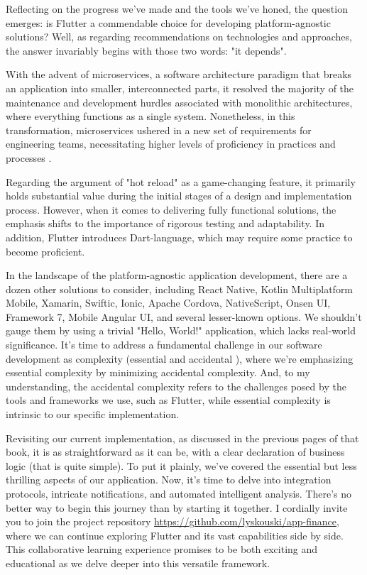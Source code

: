 
Reflecting on the progress we've made and the tools we've honed, the question emerges: is Flutter a commendable 
choice for developing platform-agnostic solutions? Well, as regarding recommendations on technologies and approaches, 
the answer invariably begins with those two words: "it depends".

With the advent of microservices, a software architecture paradigm that breaks an application into smaller, 
interconnected parts, it resolved the majority of the maintenance and development hurdles associated with monolithic 
architectures, where everything functions as a single system. Nonetheless, in this transformation, microservices 
ushered in a new set of requirements for engineering teams, necessitating higher levels of proficiency in practices 
and processes \cite{Mugr23}.

Regarding the argument of "hot reload" as a game-changing feature, it primarily holds substantial value during the 
initial stages of a design and implementation process. However, when it comes to delivering fully functional solutions, 
the emphasis shifts to the importance of rigorous testing and adaptability. In addition, Flutter introduces 
Dart-language, which may require some practice to become proficient.

In the landscape of the platform-agnostic application development, there are a dozen other solutions to consider, 
including React Native, Kotlin Multiplatform Mobile, Xamarin, Swiftic, Ionic, Apache Cordova, NativeScript, Onsen UI, 
Framework 7, Mobile Angular UI, and several lesser-known options. We shouldn't gauge them by using a trivial "Hello, 
World!" application, which lacks real-world significance. It's time to address a fundamental challenge in our software
development as complexity (essential and accidental \cite{Broo87}), where we're emphasizing essential complexity by 
minimizing accidental complexity. And, to my understanding, the accidental complexity refers to the challenges posed 
by the tools and frameworks we use, such as Flutter, while essential complexity is intrinsic to our specific 
implementation.

Revisiting our current implementation, as discussed in the previous pages of that book, it is as 
straightforward as it can be, with a clear declaration of business logic (that is quite simple). To put it plainly, 
we've covered the essential but less thrilling aspects of our application. Now, it's time to delve into integration 
protocols, intricate notifications, and automated intelligent analysis. There's no better way to begin this journey 
than by starting it together. I cordially invite you to join the project repository 
\href{https://github.com/lyskouski/app-finance}{https://github.com/lyskouski/app-finance}, where we can continue 
exploring Flutter and its vast capabilities side by side. This collaborative learning experience promises to be both 
exciting and educational as we delve deeper into this versatile framework.
